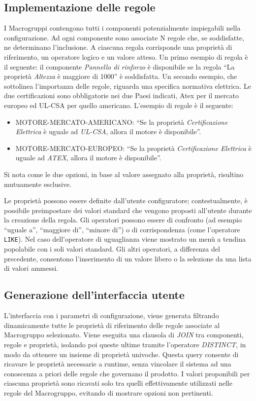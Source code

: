 \subsection{Implementazione delle regole}
I Macrogruppi contengono tutti i componenti potenzialmente impiegabili nella configurazione.
Ad ogni componente sono associate N regole che, se soddisfatte, ne determinano l'inclusione.
A ciascuna regola corrisponde una proprietà di riferimento, un operatore logico e un valore atteso.
Un primo esempio di regola è il seguente:
il componente \textit{Pannello di rinforzo} è disponibile se la regola ``La proprietà \textit{Altezza} è maggiore di 1000'' è soddisfatta.
Un secondo esempio, che sottolinea l'importanza delle regole, riguarda una specifica normativa elettrica.
Le due certificazioni sono obbligatorie nei due Paesi indicati,
Atex per il mercato europeo ed UL-CSA per quello americano.\cite{ElettricCertifications}
L'esempio di regole è il seguente:
\begin{itemize}
      \item MOTORE-MERCATO-AMERICANO: ``Se la proprietà \textit{Certificazione Elettrica} è uguale ad \textit{UL-CSA},
            allora il motore è disponibile''.
      \item MOTORE-MERCATO-EUROPEO: ``Se la proprietà \textit{Certificazione Elettrica} è uguale ad \textit{ATEX},
            allora il motore è disponibile''.
\end{itemize}
Si nota come le due opzioni, in base al valore assegnato alla proprietà, risultino mutuamente esclusive.

Le proprietà possono essere definite dall'utente configuratore; contestualmente, è possibile preimpostare
dei valori standard che vengono proposti all'utente durante la creazione della regola.
Gli operatori possono essere di confronto (ad esempio ``uguale a'', ``maggiore di'', ``minore di'')
o di corrispondenza (come l'operatore \texttt{LIKE}).
Nel caso dell'operatore di uguaglianza viene mostrato un menù a tendina popolabile con i soli valori standard.
Gli altri operatori, a differenza del precedente, consentono l'inserimento di un valore libero
o la selezione da una lista di valori ammessi.

\subsection{Generazione dell'interfaccia utente}
L'interfaccia con i parametri di configurazione, viene generata filtrando dinamicamente
tutte le proprietà di riferimento delle regole associate al Macrogruppo selezionato.
Viene eseguita una clausola di \textit{JOIN} tra componenti, regole e proprietà, isolando poi queste ultime
tramite l'operatore \textit{DISTINCT}, in modo da ottenere un insieme di proprietà univoche.
Questa query consente di ricavare le proprietà necessarie a runtime, senza vincolare il sistema
ad una conoscenza a priori delle regole che governano il prodotto.
I valori proponibili per ciascuna proprietà sono ricavati solo tra quelli
effettivamente utilizzati nelle regole del Macrogruppo,
evitando di mostrare opzioni non pertinenti.

